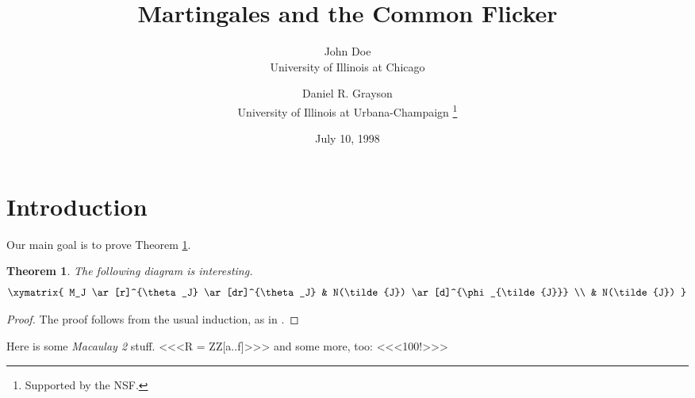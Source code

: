 \documentclass{article}
\newtheorem{theorem}	{Theorem}	[section]
\begin{document}
\author{John Doe \\ University of Illinois at Chicago
	\and
	Daniel R. Grayson \\ University of Illinois at Urbana-Champaign
	\thanks{Supported by the NSF.}
	}
\date{July 10, 1998}
\title{Martingales and the Common Flicker}
\maketitle

\section{Introduction}
Our main goal is to prove Theorem \ref{thm1}.

\begin{theorem} \label{thm1}
The following diagram is interesting.
$$
\xymatrix{
M_J \ar[r]^{\theta_J}  \ar[dr]^{\theta_J} & 
	N(\tilde{J}) \ar[d]^{\phi_{\tilde{J}}} \\
& N(\tilde{J}) 
}
$$
\end{theorem}

\begin{proof}
The proof follows from the usual induction, as in \cite{MR94g:19005}.
\end{proof}

Here is some {\sl Macaulay 2} stuff.
<<<R = ZZ[a..f]>>>
and some more, too:
<<<100!>>>



\end{document}
